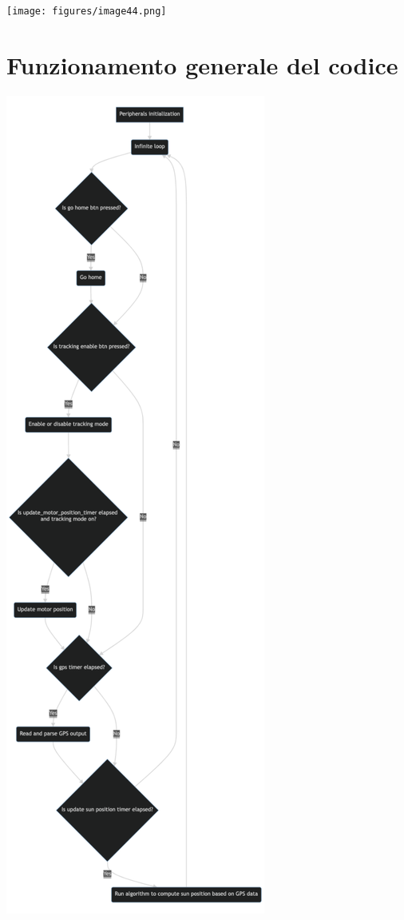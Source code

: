 \begin{center}
\texttt{[image: figures/image44.png]}
\captionsetup{type=figure}
\end{center}

\hypertarget{funzionamento-generale-del-codice}{%
\section{Funzionamento generale del
codice}\label{funzionamento-generale-del-codice}}

\begin{center}
\includegraphics[scale=0.30]{figures/image36.png}
\captionsetup{type=figure}
\end{center}

